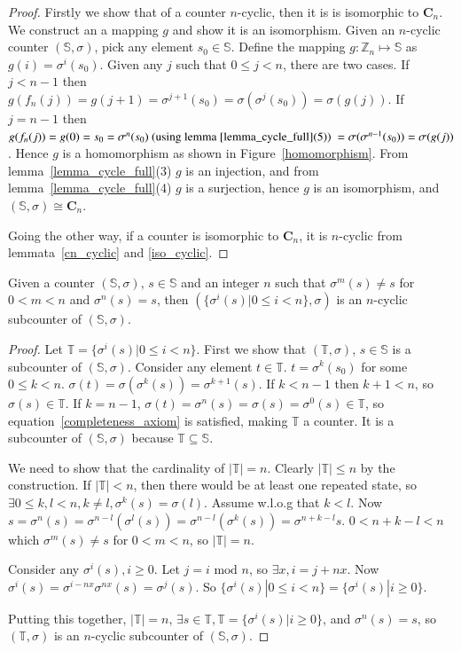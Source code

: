 \documentclass[5p, twocolumn]{elsarticle}
\begin{document}
\begin{proof}
Firstly we show that of a counter $n$-cyclic, then it is is isomorphic to $\mathbf{C}_n$. We construct an a mapping $g$ and show it is an isomorphism. Given an $n$-cyclic counter $(\mathbb{S},\sigma)$, pick any element $s_0\in\mathbb{S}$. Define the mapping $g:\mathbb{Z}_n\mapsto\mathbb{S}$ as $g(i)=\sigma^i(s_0)$. Given any $j$ such that $0\leq j<n$, there are two cases. If $j<n-1$ then $g(f_n(j))=g(j+1)=\sigma^{j+1}(s_0)=\sigma(\sigma^j(s_0))=\sigma(g(j))$. If $j=n-1$ then $g(f_n(j))=g(0)=s_0=\sigma^n(s_0) \text{ (using lemma~\ref{lemma_cycle_full}(5)) }=\sigma(\sigma^{n-1}(s_0))=\sigma(g(j))$. Hence $g$ is a homomorphism as shown in Figure~\ref{homomorphism}. From lemma~\ref{lemma_cycle_full}(3) $g$ is an injection, and from lemma~\ref{lemma_cycle_full}(4) $g$ is a surjection, hence $g$ is an isomorphism, and $(\mathbb{S},\sigma)\cong\mathbf{C}_n$.

Going the other way, if a counter is isomorphic to $\mathbf{C}_n$, it is $n$-cyclic from lemmata~\ref{cn_cyclic} and \ref{iso_cyclic}.
\end{proof}

\begin{theorem}[Generator]
Given a counter $(\mathbb{S},\sigma)$, $s\in\mathbb{S}$ and an integer $n$ such that $\sigma^m(s)\neq s$ for $0<m<n$ and $\sigma^n(s)=s$, then $(\{\sigma^i(s)|0\leq i<n\},\sigma)$ is an $n$-cyclic subcounter of $(\mathbb{S},\sigma)$.
\label{theorem_counter_generator}
\end{theorem}

\begin{proof}
Let $\mathbb{T}=\{\sigma^i(s)|0\leq i<n\}$. First we show that $(\mathbb{T},\sigma)$, $s\in\mathbb{S}$ is a subcounter of $(\mathbb{S},\sigma)$. Consider any element $t\in\mathbb{T}$. $t=\sigma^k(s_0)$ for some $0\leq k<n$. $\sigma(t)=\sigma(\sigma^k(s))=\sigma^{k+1}(s)$. If $k<n-1$ then $k+1<n$, so $\sigma(s)\in\mathbb{T}$. If $k=n-1$, $\sigma(t)=\sigma^n(s)=\sigma(s)=\sigma^0(s)\in\mathbb{T}$, so equation~\ref{completeness_axiom} is satisfied, making $\mathbb{T}$ a counter. It is a subcounter of $(\mathbb{S},\sigma)$ because $\mathbb{T}\subseteq\mathbb{S}$.

We need to show that the cardinality of $|\mathbb{T}|=n$. Clearly $|\mathbb{T}|\leq n$ by the construction. If $|\mathbb{T}|<n$, then there would be at least one repeated state, so $\exists 0\leq k,l<n, k\neq l, \sigma^k(s)=\sigma(l)$. Assume w.l.o.g that $k<l$. Now $s=\sigma^n(s)=\sigma^{n-l}(\sigma^l(s))=\sigma^{n-l}(\sigma^k(s))=\sigma^{n+k-l}s$. $0<n+k-l<n$ which $\sigma^m(s)\neq s$ for $0<m<n$, so  $|\mathbb{T}|=n$.

Consider any $\sigma^i(s),i\geq 0$. Let $j=i\text{ mod }n$, so $\exists x,i=j+nx$. Now $\sigma^i(s)=\sigma^{i-nx}\sigma^{nx}(s)=\sigma^j(s)$. So $\{\sigma^i(s)|0\leq i<n\}=\{\sigma^i(s)|i\geq 0\}$.

Putting this together, $|\mathbb{T}|=n$, $\exists s\in\mathbb{T}, \mathbb{T}=\{\sigma^i(s)|i\geq 0\}$, and $\sigma^n(s)=s$, so $(\mathbb{T},\sigma)$ is an $n$-cyclic subcounter of $(\mathbb{S},\sigma)$.

\end{proof}
\end{document}
